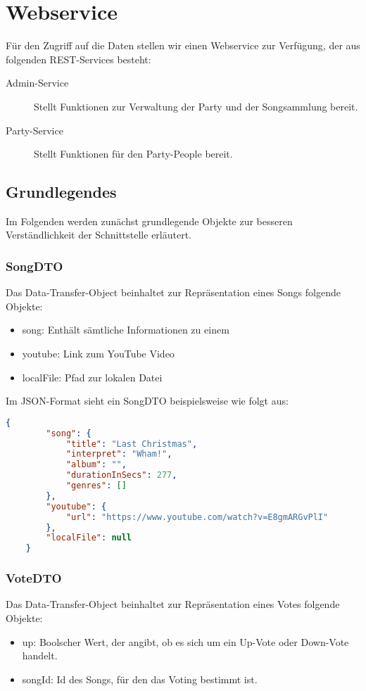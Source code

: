 \section{Webservice}
\label{cha:Webservice}
Für den Zugriff auf die Daten stellen wir einen Webservice zur Verfügung, der aus folgenden REST-Services besteht:

\begin{description}
\item [Admin-Service] Stellt Funktionen zur Verwaltung der Party und der Songsammlung bereit.
\item [Party-Service] Stellt Funktionen für den Party-People bereit.
\end{description}


\subsection{Grundlegendes}
Im Folgenden werden zunächst grundlegende Objekte zur besseren Verständlichkeit der Schnittstelle erläutert.

\subsubsection{SongDTO}
\label{object:SongDTO}
Das Data-Transfer-Object beinhaltet zur Repräsentation eines Songs folgende Objekte:
\begin{itemize}
\item song: Enthält sämtliche Informationen zu einem 
\item{youtube: Link zum YouTube Video}
\item{localFile: Pfad zur lokalen Datei}
\end{itemize}

Im JSON-Format sieht ein SongDTO beispielsweise wie folgt aus:

\begin{lstlisting}[language=json]
    {
        "song": {
            "title": "Last Christmas",
            "interpret": "Wham!",
            "album": "",
            "durationInSecs": 277,
            "genres": []
        },
        "youtube": {
            "url": "https://www.youtube.com/watch?v=E8gmARGvPlI"
        },
        "localFile": null
    }
\end{lstlisting}

\subsubsection{VoteDTO}
\label{object:VoteDTO}
Das Data-Transfer-Object beinhaltet zur Repräsentation eines Votes folgende Objekte:
\begin{itemize}
\item{up: Boolscher Wert, der angibt, ob es sich um ein Up-Vote oder Down-Vote handelt.}
\item{songId: Id des Songs, für den das Voting bestimmt ist.}
\end{itemize}

